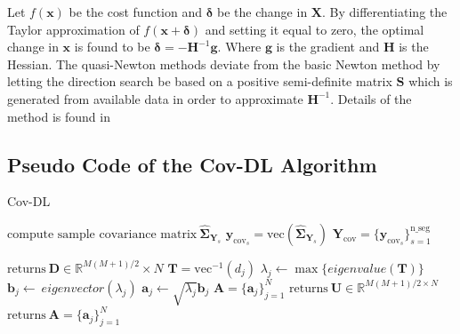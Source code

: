 Let $f(\textbf{x})$ be the cost function and $\boldsymbol{\delta}$ be the change in $\textbf{X}$. By differentiating the Taylor approximation of $f(\textbf{x}+\boldsymbol{\delta})$ and setting it equal to zero, the optimal change in $\textbf{x}$ is found to be $\boldsymbol{\delta} = -\textbf{H}^{-1}\textbf{g}$. Where $\textbf{g}$ is the gradient and $\textbf{H}$ is the Hessian. The quasi-Newton methods deviate from the basic Newton method by letting the direction search be based on a positive semi-definite matrix $\textbf{S}$ which is generated from available data in order to approximate $\textbf{H}^{-1}$. Details of the method is found in \cite[p. 175]{Optimization2007}    

\subsection{Pseudo Code of the Cov-DL Algorithm}
\begin{algorithm}[H]
\caption{Cov-DL}
\begin{algorithmic}[1]
				\State$\text{compute sample covariance matrix}\ \widehat{\boldsymbol{\Sigma}}_{\textbf{Y}_s} $
				\State$\textbf{y}_{\text{cov}_s} = \text{vec}(\widehat{\boldsymbol{\Sigma}}_{\textbf{Y}_s})$	
			\EndFor			
			\State$\textbf{Y}_{\text{cov}} = \{\textbf{y}_{\text{cov}_s}\}_{s=1}^{\text{n\_seg}}$
			
			\State$\text{returns} \ \textbf{D} \in \mathbb{R}^{M(M+1)/2}\times N$
			\EndProcedure
			\State$\textbf{T} = \text{vec}^{-1}(d_j)$            
			\State$\lambda_j\gets \max\{eigenvalue(\textbf{T})\}$
			\State$\textbf{b}_j \gets \ eigenvector(\lambda_j)$
			\State$\textbf{a}_j \gets \sqrt{\lambda_j}\textbf{b}_j$
			\EndFor
			\State$\textbf{A} = \{\textbf{a}_j\}_{j=1}^N$
			\EndIf
			\State
				\State$\text{returns} \ \textbf{U}\in \mathbb{R}^{M(M+1)/2\times N}$
				\EndProcedure
				\State$\text{returns}\ \textbf{A}= \{\textbf{a}_j\}_{j=1}^{N}$
				\EndProcedure
			\EndIf
           \EndProcedure
        \end{algorithmic} 
        \label{alg:Cov1}
\end{algorithm}

